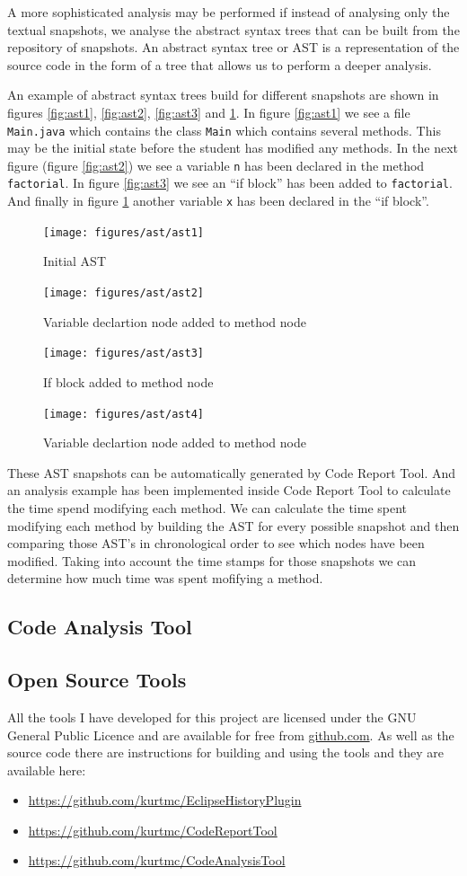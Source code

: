 \documentclass[twocolumn]{article}
\begin{document}
A more sophisticated analysis may be performed if instead of analysing only the
textual snapshots, we analyse the abstract syntax trees that can be built from
the repository of snapshots. An abstract syntax tree or AST is a representation
of the source code in the form of a tree that allows us to perform a deeper
analysis.

An example of abstract syntax trees build for different snapshots are shown in
figures \ref{fig:ast1}, \ref{fig:ast2}, \ref{fig:ast3} and \ref{fig:ast4}. In
figure \ref{fig:ast1} we see a file \texttt{Main.java} which contains the class
\texttt{Main} which contains several methods. This may be the initial state
before the student has modified any methods. In the next figure (figure
\ref{fig:ast2}) we see a variable \texttt{n} has been declared in the method
\texttt{factorial}. In figure \ref{fig:ast3} we see an ``if block'' has been added
to \texttt{factorial}. And finally in figure \ref{fig:ast4} another variable
\texttt{x} has been declared in the ``if block''.

\begin{figure}[h!bt]
\centering
\texttt{[image: figures/ast/ast1]}
\caption{Initial AST}
\label{fig:ast1}
\centering
\texttt{[image: figures/ast/ast2]}
\caption{Variable declartion node added to method node}
\label{fig:ast2}
\centering
\texttt{[image: figures/ast/ast3]}
\caption{If block added to method node}
\label{fig:ast3}
\centering
\texttt{[image: figures/ast/ast4]}
\caption{Variable declartion node added to method node}
\label{fig:ast4}
\end{figure}

These AST snapshots can be automatically generated by Code Report Tool. And an
analysis example has been implemented inside Code Report Tool to calculate the
time spend modifying each method. We can calculate the time spent modifying
each method by building the AST for every possible snapshot and then comparing
those AST's in chronological order to see which nodes have been modified.
Taking into account the time stamps for those snapshots we can determine how
much time was spent mofifying a method.

\subsection{Code Analysis Tool}

\subsection{Open Source Tools}
All the tools I have developed for this project are licensed under the GNU
General Public Licence and are available for free from \url{github.com}. As
well as the source code there are instructions for building and using the tools
and they are available here:
{\footnotesize
\begin{itemize}
\item \url{https://github.com/kurtmc/EclipseHistoryPlugin}
\item \url{https://github.com/kurtmc/CodeReportTool}
\item \url{https://github.com/kurtmc/CodeAnalysisTool}
\end{itemize}
}
\end{document}
